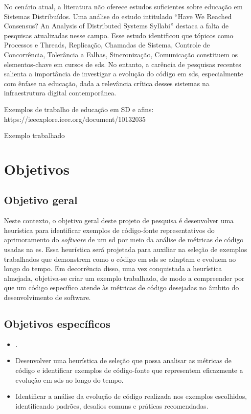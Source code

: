 No cenário atual, a literatura não oferece estudos suficientes sobre educação em Sistemas Distribuídos. Uma análise do estudo intitulado ``Have We Reached Consensus? An Analysis of Distributed Systems Syllabi'' \cite{HaveWeReachedConsensus} destaca a falta de pesquisas atualizadas nesse campo. Esse estudo identificou que tópicos como Processos e Threads, Replicação, Chamadas de Sistema, Controle de Concorrência, Tolerância a Falhas, Sincronização, Comunicação constituem os elementos-chave em cursos de \gls{sds}. No entanto, a carência de pesquisas recentes salienta a importância de investigar a evolução do código em \gls{sds}, especialmente com ênfase na educação, dada a relevância crítica desses sistemas na infraestrutura digital contemporânea.

Exemplos de trabalho de educação em SD e afins: https://ieeexplore.ieee.org/document/10132035

Exemplo trabalhado

\section{Objetivos}\label{sec:objetivos}
\subsection{Objetivo geral}\label{subsec:objetivoGeral}
 Neste contexto, o objetivo geral deste projeto de pesquisa é desenvolver uma heurística para identificar exemplos de código-fonte representativos do aprimoramento do \textit{software} de um \gls{sd} por meio da análise de métricas de código usadas na \gls{es}. Essa heurística será projetada para auxiliar na seleção de exemplos trabalhados que demonstrem como o código em \gls{sds} se adaptam e evoluem ao longo do tempo. Em decorrência disso, uma vez conquistada a heurística almejada, objetiva-se criar um exemplo trabalhado, de modo a compreender por que um código específico atende às métricas de código desejadas no âmbito do desenvolvimento de software.

\subsection{Objetivos específicos}\label{subsec:objetivosEspecificos}
\begin{itemize}
    \item .
    \item Desenvolver uma heurística de seleção que possa analisar as métricas de código e identificar exemplos de código-fonte que representem eficazmente a evolução em \gls{sds} ao longo do tempo.
    \item Identificar a análise da evolução de código realizada nos exemplos escolhidos, identificando padrões, desafios comuns e práticas recomendadas.
\end{itemize}


